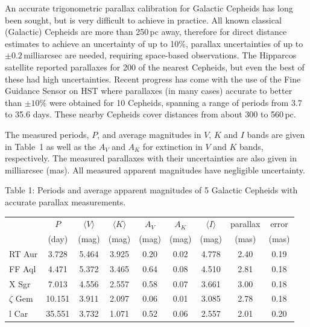 An accurate trigonometric parallax calibration for Galactic Cepheids has long
been sought, but is very difficult to achieve in practice. All known classical
(Galactic) Cepheids are more than 250\,pc away, therefore for direct distance
estimates to achieve an uncertainty of up to 10\%, parallax uncertainties of
up to $\pm 0.2$\,milliarcsec are needed, requiring space-based observations.
The Hipparcos satellite reported parallaxes for 200 of the nearest Cepheids,
but even the best of these had high uncertainties. Recent progress has come
with the use of the Fine Guidance Sensor on HST where parallaxes (in many
cases) accurate to better than $\pm 10$\% were obtained for 10 Cepheids,
spanning a range of periods from 3.7 to 35.6 days. These nearby Cepheids cover
distances from about 300 to 560\,pc.

The measured periods, $P$, and average magnitudes in $V$, $K$ and $I$ bands
are given in Table~1 as well as the $A_V$ and $A_K$ for extinction in $V$ and
$K$ bands, respectively. The measured parallaxes with their uncertainties are
also given in milliarcsec (mas). All measured apparent magnitudes have
negligible uncertainty.

Table 1: Periods and average apparent magnitudes of 5 Galactic Cepheids with
accurate parallax measurements.

\begin{center}
\begin{tabular}{l|c|c|c|c|c|c|c|c}
 & $P$ & $\langle V\rangle$ & $\langle K\rangle$ & $A_V$ & $A_K$
 & $\langle I\rangle$ & parallax & error \\
 & (day) & (mag) & (mag) & (mag) & (mag) & (mag) & (mas) & (mas) \\
\hline
RT Aur      & 3.728  & 5.464 & 3.925 & 0.20 & 0.02 & 4.778 & 2.40 & 0.19 \\
FF Aql      & 4.471  & 5.372 & 3.465 & 0.64 & 0.08 & 4.510 & 2.81 & 0.18 \\
X Sgr       & 7.013  & 4.556 & 2.557 & 0.58 & 0.07 & 3.661 & 3.00 & 0.18 \\
$\zeta$ Gem & 10.151 & 3.911 & 2.097 & 0.06 & 0.01 & 3.085 & 2.78 & 0.18 \\
l Car       & 35.551 & 3.732 & 1.071 & 0.52 & 0.06 & 2.557 & 2.01 & 0.20 \\
\end{tabular}
\end{center}

